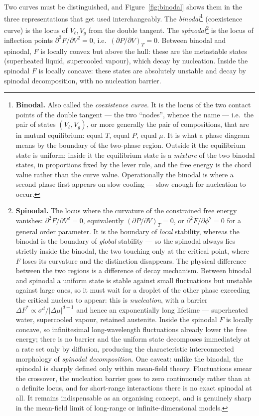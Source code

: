 \documentclass[10pt,a4paper]{article}
\theoremstyle{remark}
\begin{document}
Two curves must be distinguished, and Figure~\ref{fig:binodal} shows them in the
three representations that get used interchangeably. The
\emph{binodal}\footnote{\label{fn:binodal}\textbf{Binodal.} Also called the
\emph{coexistence curve}. It is the locus of the two contact points of the double
tangent --- the two ``nodes'', whence the name --- i.e.\ the pair of states
$(V_\ell,V_g)$, or more generally the pair of compositions, that are in mutual
equilibrium: equal $T$, equal $P$, equal $\mu$. It is what a phase diagram means
by the boundary of the two-phase region. Outside it the equilibrium state is
uniform; inside it the equilibrium state is a \emph{mixture} of the two binodal
states, in proportions fixed by the lever rule, and the free energy is the chord
value rather than the curve value. Operationally the binodal is where a second
phase first appears on slow cooling --- slow enough for nucleation to occur.}
(coexistence curve) is the locus of $V_\ell,V_g$ from the double tangent. The
\emph{spinodal}\footnote{\label{fn:spinodal}\textbf{Spinodal.} The locus where the
curvature of the constrained free energy vanishes:
$\partial^{2}F/\partial V^{2}=0$, equivalently $(\partial P/\partial V)_T=0$, or
$\partial^{2}F/\partial\phi^{2}=0$ for a general order parameter. It is the
boundary of \emph{local} stability, whereas the binodal is the boundary of
\emph{global} stability --- so the spinodal always lies strictly inside the
binodal, the two touching only at the critical point, where $F$ loses its
curvature and the distinction disappears. The physical difference between the two
regions is a difference of decay mechanism. Between binodal and spinodal a
uniform state is stable against small fluctuations but unstable against large
ones, so it must wait for a droplet of the other phase exceeding the critical
nucleus to appear: this is \emph{nucleation}, with a barrier
$\Delta F^{\ast}\propto\sigma^{d}/|\Delta\mu|^{d-1}$ and hence an exponentially
long lifetime --- superheated water, supercooled vapour, retained austenite.
Inside the spinodal $F$ is locally concave, so infinitesimal long-wavelength
fluctuations already lower the free energy; there is no barrier and the uniform
state decomposes immediately at a rate set only by diffusion, producing the
characteristic interconnected morphology of \emph{spinodal decomposition}. One
caveat: unlike the binodal, the spinodal is sharply defined only within mean-field
theory. Fluctuations smear the crossover, the nucleation barrier goes to zero
continuously rather than at a definite locus, and for short-range interactions
there is no exact spinodal at all. It remains indispensable as an
organising concept, and is genuinely sharp in the mean-field limit of long-range
or infinite-dimensional models.} is the locus of inflection points
$\partial^2F/\partial V^2=0$, i.e.\ $(\partial P/\partial V)_T=0$. Between binodal
and spinodal, $F$ is locally convex but above the hull: these are the metastable
states (superheated liquid, supercooled vapour), which decay by nucleation.
Inside the spinodal $F$ is locally concave: these states are absolutely unstable
and decay by spinodal decomposition, with no nucleation barrier.
\end{document}
